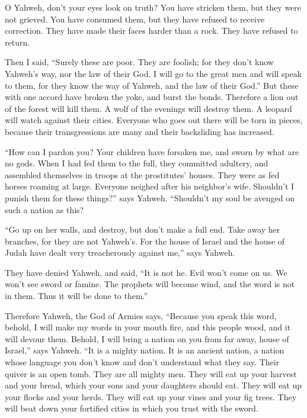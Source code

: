  O Yahweh, don't your eyes look on truth? You have stricken
them, but they were not grieved. You have consumed them, but they have
refused to receive correction. They have made their faces harder than a
rock. They have refused to return.

 Then I said, ``Surely these are poor. They are foolish; for
they don't know Yahweh's way, nor the law of their God.  I
will go to the great men and will speak to them, for they know the way
of Yahweh, and the law of their God.'' But these with one accord have
broken the yoke, and burst the bonds.  Therefore a lion out
of the forest will kill them. A wolf of the evenings will destroy them.
A leopard will watch against their cities. Everyone who goes out there
will be torn in pieces, because their transgressions are many and their
backsliding has increased.

 ``How can I pardon you? Your children have forsaken me, and
sworn by what are no gods. When I had fed them to the full, they
committed adultery, and assembled themselves in troops at the
prostitutes' houses.  They were as fed horses roaming at
large. Everyone neighed after his neighbor's wife. 
Shouldn't I punish them for these things?'' says Yahweh. ``Shouldn't my
soul be avenged on such a nation as this?

 ``Go up on her walls, and destroy, but don't make a full
end. Take away her branches, for they are not Yahweh's. 
For the house of Israel and the house of Judah have dealt very
treacherously against me,'' says Yahweh.

 They have denied Yahweh, and said, ``It is not he. Evil
won't come on us. We won't see sword or famine.  The
prophets will become wind, and the word is not in them. Thus it will be
done to them.''

 Therefore Yahweh, the God of Armies says, ``Because you
speak this word, behold, I will make my words in your mouth fire, and
this people wood, and it will devour them.  Behold, I will
bring a nation on you from far away, house of Israel,'' says Yahweh.
``It is a mighty nation. It is an ancient nation, a nation whose
language you don't know and don't understand what they say.
 Their quiver is an open tomb. They are all mighty men.
 They will eat up your harvest and your bread, which your
sons and your daughters should eat. They will eat up your flocks and
your herds. They will eat up your vines and your fig trees. They will
beat down your fortified cities in which you trust with the sword.


